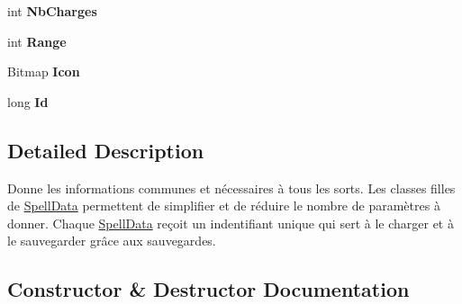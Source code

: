\begin{DoxyCompactItemize}
\mbox{\label{class_tentacle_slicers_1_1spells_1_1_spell_data_ad308021013afbfcb811852f4943a23c1}} 
int {\bfseries Nb\+Charges}
\item 
\mbox{\label{class_tentacle_slicers_1_1spells_1_1_spell_data_ad3f65c1a67886b98f980ec599a30fd97}} 
int {\bfseries Range}
\item 
\mbox{\label{class_tentacle_slicers_1_1spells_1_1_spell_data_a436435ff6cb4c4de32310c7387b7856a}} 
Bitmap {\bfseries Icon}
\item 
\mbox{\label{class_tentacle_slicers_1_1spells_1_1_spell_data_a820adaee8617e7313456b0ae6c2cc5cb}} 
long {\bfseries Id}
\end{DoxyCompactItemize}


\subsection{Detailed Description}
Donne les informations communes et nécessaires à tous les sorts. Les classes filles de \hyperlink{class_tentacle_slicers_1_1spells_1_1_spell_data}{Spell\+Data} permettent de simplifier et de réduire le nombre de paramètres à donner. Chaque \hyperlink{class_tentacle_slicers_1_1spells_1_1_spell_data}{Spell\+Data} reçoit un indentifiant unique qui sert à le charger et à le sauvegarder grâce aux sauvegardes. 



\subsection{Constructor \& Destructor Documentation}
\mbox{\label{class_tentacle_slicers_1_1spells_1_1_spell_data_a3b2b602a51419a4672fb611cf9894957}} 
